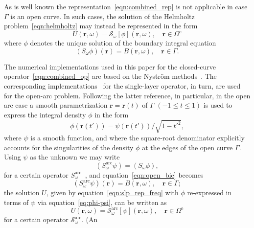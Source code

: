 \documentclass[11pt]{article}
\theoremstyle{plain}
\theoremstyle{remark}
\def \br{\mathbf{r}}
\begin{document}
As is well known the representation~\eqref{eqn:combined_rep} is not
applicable in case $\Gamma$ is an open curve. In such cases, the
solution of the Helmholtz problem~\eqref{eqn:helmholtz} may instead be
represented in the form
\begin{equation}\label{eqn:slp_rep_freq}
    U(\br,\omega) = \mathcal{S}_\omega[\phi](\br,\omega), \quad \br \in \Omega^{\mathrm{e}}
\end{equation}
where $\phi$ denotes the unique solution of the boundary integral equation
\begin{equation}\label{eqn:open_bie}
  (S_\omega\phi)(\br) = B(\br,\omega), \quad \br \in \Gamma.
\end{equation}


The numerical implementations used in this paper for the closed-curve
operator~\eqref{eqn:combined_op} are based on the Nystr\"{o}m
methods~\cite[Sec. 3.6]{COLTON:2019}. The corresponding
implementations~\cite{bruno2013high} for the single-layer operator, in
turn, are used for the open-arc problem. Following the latter
reference, in particular, in the open arc case a smooth
parametrization $\br = \br(t)$ of $\Gamma$ $(-1 \le t \le 1)$ is used
to express the integral density $\phi$ in the form
\begin{equation}
  \label{eq:phi-psi}
  \phi(\br(t')) = \psi(\br(t')) / \sqrt{1 - t'^2},
\end{equation}
where $\psi$ is a smooth function, and where the square-root
denominator explicitly accounts for the singularities of the density
$\phi$ at the edges of the open curve $\Gamma$. Using $\psi$ as the
unknown we may write
\begin{equation}
  \label{eq:arc_COV}
  (S^\mathrm{arc}_\omega\psi) = (S_\omega\phi), 
\end{equation}
for a certain operator
$S^\mathrm{arc}_\omega$~\cite{lintner2015generalized,bruno2013high},
and equation~\eqref{eqn:open_bie} becomes
\begin{equation}\label{eqn:open_bie-sqrt}
  (S^\mathrm{arc}_\omega\psi)(\br) = B(\br,\omega), \quad \br \in \Gamma;
\end{equation}
the solution $U$, given by equation~\eqref{eqn:slp_rep_freq} with
$\phi$ re-expressed in terms of $\psi$ via
equation~\eqref{eq:phi-psi}, can be written as
\begin{equation}\label{eqn:slp_rep_freq_arc}
  U(\br,\omega) = \mathcal{S}^\mathrm{arc}_\omega[\psi](\br,\omega), \quad \br \in \Omega^{\mathrm{e}}
\end{equation}
for a certain operator $\mathcal{S}^\mathrm{arc}_\omega$. (An
\end{document}
